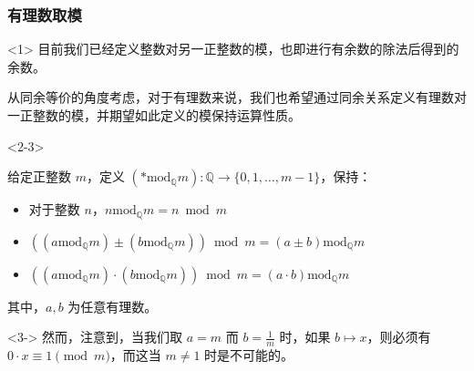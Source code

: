 \documentclass{../pkslide}
\begin{document}
\begin{frame}
  \frametitle{有理数取模}
  \begin{onlyenv}<1>
    目前我们已经定义整数对另一正整数的模，也即进行有余数的除法后得到的余数。
    
    \emptyline
    
    从同余等价的角度考虑，对于有理数来说，我们也希望通过同余关系定义有理数对一正整数的模，并期望如此定义的模保持运算性质。
  \end{onlyenv}
  
  \begin{onlyenv}<2-3>
    \begin{definition}[有理数取模]
      给定正整数 $m$，定义 $({\ast} \mathbin{\mathrm{mod}_{\mathbb Q}} m) : \mathbb Q \to \{ 0, 1, \ldots, m - 1 \}$，保持：
      
      \begin{itemize}
        \item 对于整数 $n$，$n \mathbin{\mathrm{mod}_{\mathbb Q}} m = n \bmod m$
        \item $((a \mathbin{\mathrm{mod}_{\mathbb Q}} m) \pm (b \mathbin{\mathrm{mod}_{\mathbb Q}} m)) \bmod m = (a \pm b) \mathbin{\mathrm{mod}_{\mathbb Q}} m$
        \item $((a \mathbin{\mathrm{mod}_{\mathbb Q}} m) \cdot (b \mathbin{\mathrm{mod}_{\mathbb Q}} m)) \bmod m = (a \cdot b) \mathbin{\mathrm{mod}_{\mathbb Q}} m$
      \end{itemize}
      
      其中，$a, b$ 为任意有理数。
    \end{definition}
    
    \begin{uncoverenv}<3->
      然而，注意到，当我们取 $a = m$ 而 $b = \frac{1}{m}$ 时，如果 $b \mapsto x$，则必须有 $0 \cdot x \equiv 1 \pmod{m}$，而这当 $m \ne 1$ 时是不可能的。
    \end{uncoverenv}
  \end{onlyenv}
\end{frame}
\end{document}

